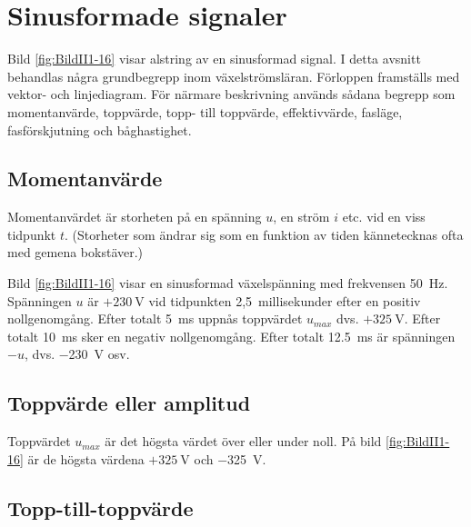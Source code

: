 \section{Sinusformade signaler}


Bild \ref{fig:BildII1-16} visar alstring av en sinusformad signal.
I detta avsnitt behandlas några grundbegrepp inom växelströmsläran.
Förloppen framställs med vektor- och linjediagram.
För närmare beskrivning används sådana begrepp som momentanvärde,
toppvärde, topp- till toppvärde, effektivvärde, fasläge, fasförskjutning och
båghastighet.

\subsection{Momentanvärde}

Momentanvärdet är storheten på en spänning \(u\), en ström \(i\) etc. vid en
viss tidpunkt \(t\).
(Storheter som ändrar sig som en funktion av tiden kännetecknas ofta med gemena
bokstäver.)

Bild \ref{fig:BildII1-16} visar en sinusformad växelspänning med frekvensen
\SI{50}{\hertz}.
Spänningen \(u\) är \(+230\ \text{V}\) vid tidpunkten 2,5~millisekunder efter en
positiv nollgenomgång.
Efter totalt \SI{5}{\milli\second} uppnås toppvärdet \(u_{max}\) dvs. \(+325\ \text{V}\).
Efter totalt \SI{10}{\milli\second} sker en negativ nollgenomgång.
Efter totalt \SI{12,5}{\milli\second} är spänningen \(-u\), dvs. \SI{-230}{\volt} osv.

\subsection{Toppvärde eller amplitud}

Toppvärdet \(u_{max}\) är det högsta värdet över eller under noll.
På bild \ref{fig:BildII1-16} är de högsta värdena \(+325\ \text{V}\) och
\SI{-325}{\volt}.

\subsection{Topp-till-toppvärde}


